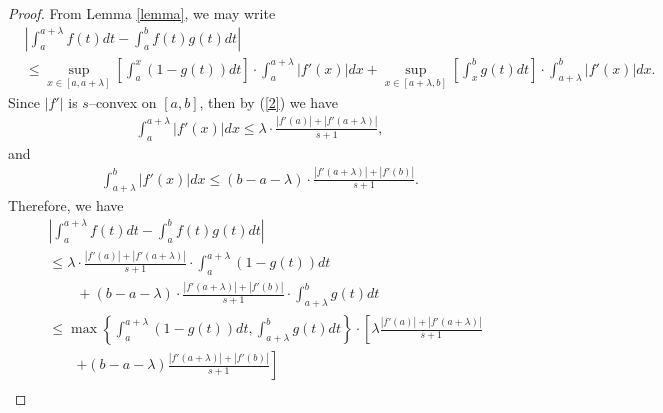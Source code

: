 \documentclass{amsart}
\theoremstyle{plain}
\numberwithin{equation}{section}
\begin{document}
\begin{proof}
From Lemma \ref{lemma}, we may write
\begin{align*}
&\left| {\int_a^{a + \lambda } {f\left( t \right)dt}  - \int_a^b
{f\left( t \right)g\left( t \right)dt} } \right|
\\
&\le \mathop {\sup }\limits_{x \in \left[ {a,a + \lambda }
\right]} \left[ {\int_a^x {\left( {1 - g\left( t \right)}
\right)dt} } \right] \cdot \int_a^{a + \lambda } \left|
f'\left(x\right) \right|dx + \mathop {\sup }\limits_{x \in \left[
{a + \lambda ,b} \right]} \left[ {\int_x^b {g\left( t \right)dt} }
\right] \cdot \int_{a + \lambda }^b
\left|f'\left(x\right)\right|dx.
\end{align*}
Since $|f'|$ is $s$--convex on $[a,b]$, then by (\ref{2}) we have
\begin{align*}
\int_a^{a + \lambda}  \left|f'\left(x\right)\right|dx \le
\lambda\cdot \frac{{\left| {f'\left( a \right)} \right| + \left|
{f'\left( {a + \lambda } \right)} \right|}}{{s + 1}},
\end{align*}
and
\begin{align*}
\int_{a + \lambda }^b \left|f'\left(x\right)\right|dx \le \left(
{b - a - \lambda } \right)\cdot\frac{{\left| {f'\left( {a +
\lambda } \right)} \right| + \left| {f'\left( b \right)}
\right|}}{{s + 1}}.
\end{align*}
Therefore, we have
\begin{align*}
&\left| {\int_a^{a + \lambda } {f\left( t \right)dt}  - \int_a^b
{f\left( t \right)g\left( t \right)dt} } \right|
\\
&\le\lambda\cdot \frac{{\left| {f'\left( a \right)} \right| +
\left| {f'\left( {a + \lambda } \right)} \right|}}{{s + 1}} \cdot
\int_a^{a + \lambda } {\left( {1 - g\left( t \right)} \right)dt}
\\
&\qquad+ \left( {b - a - \lambda } \right)\cdot\frac{{\left|
{f'\left( {a + \lambda } \right)} \right| + \left| {f'\left( b
\right)} \right|}}{{s + 1}}
 \cdot \int_{a + \lambda }^b {g\left( t \right)dt}
\\
&\le \max \left\{ {\int_a^{a + \lambda } {\left( {1 - g\left( t
\right)} \right)dt} ,\int_{a + \lambda }^b {g\left( t \right)dt} }
\right\} \cdot \left[ {\lambda \frac{{\left| {f'\left( a \right)}
\right| + \left| {f'\left( {a + \lambda } \right)} \right|}}{{s +
1}}}\right.
\\
&\qquad\left. {+ \left( {b - a - \lambda } \right)\frac{{\left|
{f'\left( {a + \lambda } \right)} \right| + \left| {f'\left( b
\right)} \right|}}{{s + 1}}}\right]
\\

\end{align*}
\end{proof}
\end{document}
